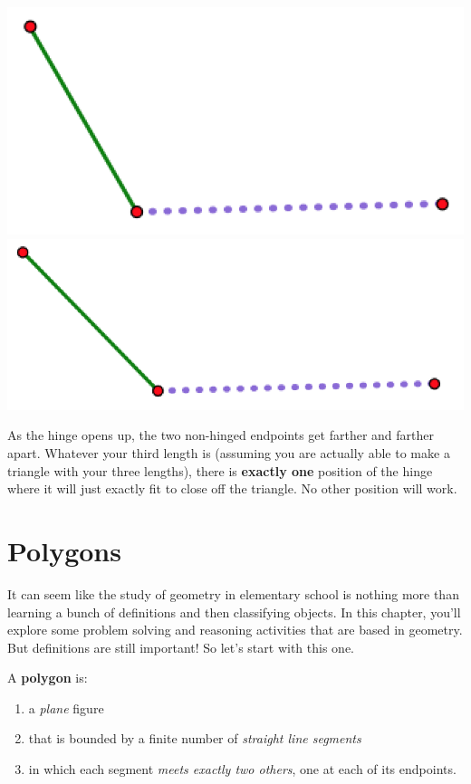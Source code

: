 \begin{center}
\includegraphics[scale = .4]{open6}
\quad
\includegraphics[scale = .4]{open7}
\end{center}


As the hinge opens up, the two non-hinged endpoints get farther and farther apart.  Whatever your third length is (assuming you are actually able to make a triangle with your three lengths), there is {\bf exactly one} position of the hinge where it will just exactly fit to close off the triangle.  No other position will work.






\newpage

\section{Polygons}
It can seem like the study of geometry in elementary school is nothing more than learning a bunch of definitions and then classifying objects.  In this chapter, you'll explore some problem solving and reasoning activities that are based in geometry.  But definitions are still important!  So let's start with this one.

\bigskip

\begin{define}
A {\bf polygon} is:
\begin{enumerate}
\item
 a \emph{plane} figure
 \item
  that is bounded by a finite number of \emph{straight line segments}
  \item
  in which each segment \emph{meets exactly two others}, one at each of its endpoints.
\end{enumerate}
\end{define}

